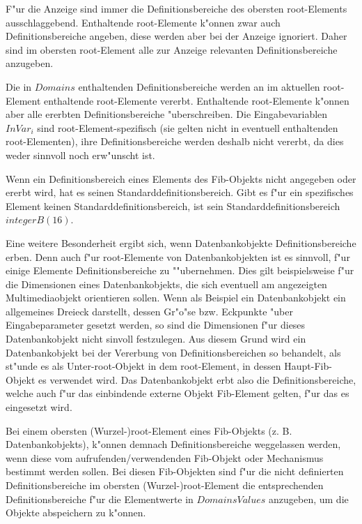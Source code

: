 F"ur die Anzeige sind immer die Definitionsbereiche des obersten root-Elements ausschlaggebend. Enthaltende root-Elemente k"onnen zwar auch Definitionsbereiche angeben, diese werden aber bei der Anzeige ignoriert. Daher sind im obersten root-Element alle zur Anzeige relevanten Definitionsbereiche anzugeben.

Die in $Domains$ enthaltenden Definitionsbereiche werden an im aktuellen root-Element enthaltende root-Elemente vererbt. Enthaltende root-Elemente k"onnen aber alle ererbten Definitionsbereiche "uberschreiben. Die Eingabevariablen $InVar_i$ sind root-Element-spezifisch (sie gelten nicht in eventuell enthaltenden root-Elementen), ihre Definitionsbereiche werden deshalb nicht vererbt, da dies weder sinnvoll noch erw"unscht ist.

Wenn ein Definitionsbereich eines Elements des Fib-Objekts nicht angegeben oder ererbt wird, hat es seinen Standarddefinitionsbereich. Gibt es f"ur ein spezifisches Element keinen Standarddefinitionsbereich, ist sein Standarddefinitionsbereich $integerB(16)$.

Eine weitere Besonderheit ergibt sich, wenn Datenbankobjekte Definitionsbereiche erben. Denn auch f"ur root-Elemente von Datenbankobjekten ist es sinnvoll, f"ur einige Elemente Definitionsbereiche zu ""ubernehmen. Dies gilt beispielsweise f"ur die Dimensionen eines Datenbankobjekts, die sich eventuell am angezeigten Multimediaobjekt orientieren sollen. Wenn als Beispiel ein Datenbankobjekt ein allgemeines Dreieck darstellt, dessen Gr"o"se bzw. Eckpunkte "uber Eingabeparameter gesetzt werden, so sind die Dimensionen f"ur dieses Datenbankobjekt nicht sinvoll festzulegen. Aus diesem Grund wird ein Datenbankobjekt bei der Vererbung von Definitionsbereichen so behandelt, als st"unde es als Unter-root-Objekt in dem root-Element, in dessen Haupt-Fib-Objekt es verwendet wird. Das Datenbankobjekt erbt also die Definitionsbereiche, welche auch f"ur das einbindende externe Objekt Fib-Element gelten, f"ur das es eingesetzt wird.

Bei einem obersten (Wurzel-)root-Element eines Fib-Objekts (z. B. Datenbankobjekts), k"onnen demnach Definitionsbereiche weggelassen werden, wenn diese vom aufrufenden/verwendenden Fib-Objekt oder Mechanismus bestimmt werden sollen. Bei diesen Fib-Objekten sind f"ur die nicht definierten Definitionsbereiche im obersten (Wurzel-)root-Element die entsprechenden Definitionsbereiche f"ur die Elementwerte in $DomainsValues$ anzugeben, um die Objekte abspeichern zu k"onnen.


